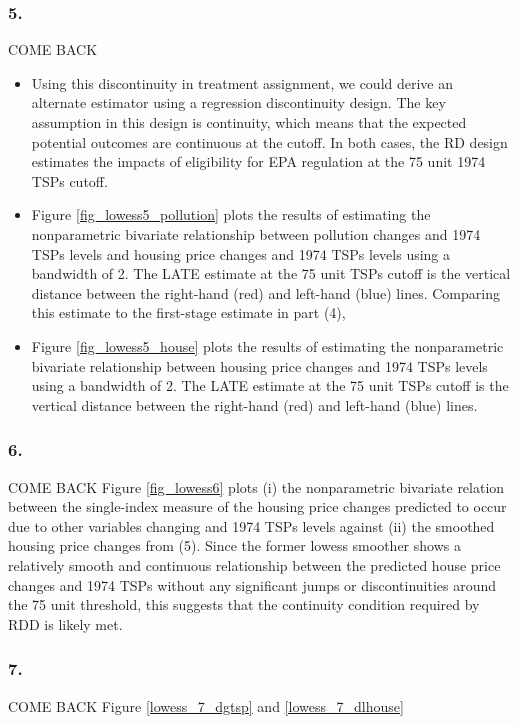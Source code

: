 \documentclass[12pt]{article}
\begin{document}
\subsubsection*{5.}
COME BACK
\begin{itemize}
\item Using this discontinuity in treatment assignment, we could derive an alternate estimator using a regression discontinuity design. The key assumption in this design is continuity, which means that the expected potential outcomes are continuous at the cutoff. In both cases, the RD design estimates the impacts of eligibility for EPA regulation at the 75 unit 1974 TSPs cutoff.
\item Figure \ref{fig_lowess5_pollution} plots the results of estimating the nonparametric bivariate relationship between pollution changes and 1974 TSPs levels and housing price changes and 1974 TSPs levels using a bandwidth of 2. The LATE estimate at the 75 unit TSPs cutoff is the vertical distance between the right-hand (red) and left-hand (blue) lines. Comparing this estimate to the first-stage estimate in part (4), 
\item Figure \ref{fig_lowess5_house} plots the results of estimating the nonparametric bivariate relationship between housing price changes and 1974 TSPs levels using a bandwidth of 2. The LATE estimate at the 75 unit TSPs cutoff is the vertical distance between the right-hand (red) and left-hand (blue) lines.
\end{itemize}





\subsubsection*{6.}
COME BACK
Figure \ref{fig_lowess6} plots (i) the nonparametric bivariate relation between the single-index measure of the housing price changes predicted to occur due to other variables changing and 1974 TSPs levels against (ii) the smoothed housing price changes from (5). Since the former lowess smoother shows a relatively smooth and continuous relationship between the predicted house price changes and 1974 TSPs without any significant jumps or discontinuities around the 75 unit threshold, this suggests that the continuity condition required by RDD is likely met.

\subsubsection*{7.}
COME BACK
Figure \ref{lowess_7_dgtsp} and \ref{lowess_7_dlhouse}
\end{document}
